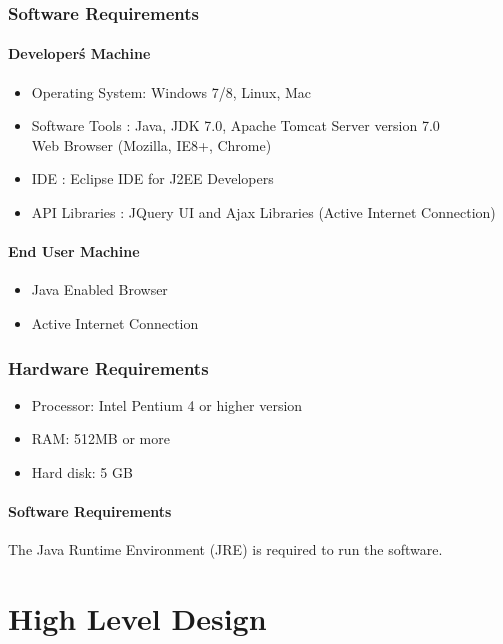 \documentclass[12pt,a4paper]{report}
\begin{document}
\subsection{Software Requirements}
\subsubsection{Developer\'s Machine}
\begin{itemize}
\item{	Operating System: Windows 7/8, Linux, Mac}
\item{  Software Tools : Java, JDK 7.0, Apache Tomcat Server version 7.0\\ Web Browser (Mozilla, IE8+, Chrome)} 
\item {IDE : Eclipse IDE for J2EE Developers}
\item {API Libraries : }JQuery UI and Ajax Libraries (Active Internet Connection)

\end{itemize}
\subsubsection{End User Machine}
\begin{itemize}
\item {Java Enabled Browser }
\item { Active Internet Connection }
\end{itemize}
\subsection{Hardware Requirements}
\begin{itemize}
\item{Processor: Intel Pentium 4 or higher version}
\item{RAM: 512MB or more}
\item{Hard disk: 5 GB}
\end{itemize}
\subsubsection{Software Requirements }
The Java Runtime Environment (JRE) is required to run the software.
\pagestyle{fancy}
\chead{}
\rfoot{\small{\thepage}}
\renewcommand{\headrulewidth}{0.4pt}
\renewcommand{\footrulewidth}{0.4pt}
\chapter{High Level Design}
\end{document}
